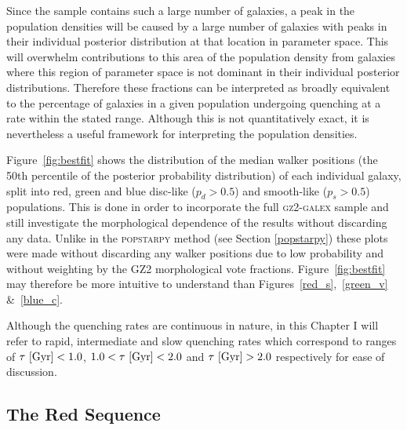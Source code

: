 Since the sample contains such a large number of galaxies, a peak in the population densities will be caused by a large number of galaxies with peaks in their individual posterior distribution at that location in parameter space. This will overwhelm contributions to this area of the population density from galaxies where this region of parameter space is not dominant in their individual posterior distributions. Therefore these fractions can be interpreted as broadly equivalent to the percentage of galaxies in a given population undergoing quenching at a rate within the stated range. Although this is not quantitatively exact, it is nevertheless a useful framework for interpreting the population densities.

Figure~\ref{fig:bestfit} shows the distribution of the median walker positions (the 50th percentile of the posterior probability distribution) of each individual galaxy, split into red, green and blue disc-like ($p_d > 0.5$) and smooth-like ($p_s > 0.5$)  populations. This is done in order to incorporate the full \textsc{gz2-galex} sample and still investigate the morphological dependence of the results without discarding any data. Unlike in the \textsc{popstarpy} method (see Section \ref{popstarpy}) these plots were made without discarding any walker positions due to low probability and without weighting by the GZ2 morphological vote fractions. Figure~\ref{fig:bestfit} may therefore be more intuitive to understand than Figures~\ref{red_s},~\ref{green_v} \&~\ref{blue_c}.

Although the quenching rates are continuous in nature, in this Chapter I will refer to rapid, intermediate and slow quenching rates which correspond to ranges of  $\tau ~\rm{[Gyr]} < 1.0$, $1.0 < \tau ~\rm{[Gyr]} < 2.0$ and $\tau ~\rm{[Gyr]} > 2.0$ respectively for ease of discussion.



\subsection{The Red Sequence}\label{rs}

